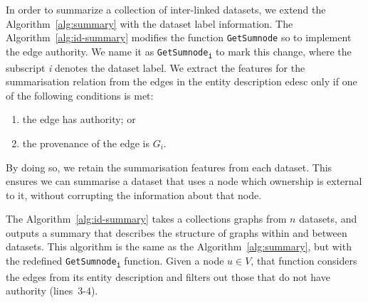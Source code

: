 
In order to summarize a collection of inter-linked datasets, we extend the Algorithm~\ref{alg:summary} with the dataset label information.
The Algorithm~\ref{alg:id-summary} modifies the function \texttt{GetSumnode} so to implement the edge authority.
We name it as \texttt{GetSumnode\textsubscript{i}} to mark this change, where the subscript \emph{i} denotes the dataset label.
We extract the features for the summarisation relation from the edges in the entity description \gls{edesc} only if one of the following conditions is met:
\begin{enumerate}
\item the edge has authority; or
\item the provenance of the edge is $G_i$.
\end{enumerate}
By doing so, we retain the summarisation features from each dataset. This ensures we can summarise a dataset that uses a node which ownership is external to it, without corrupting the information about that node.%

The Algorithm~\ref{alg:id-summary} takes a collections graphs from $n$ datasets, and outputs a summary that describes the structure of graphs within and between datasets. This algorithm is the same as the Algorithm~\ref{alg:summary}, but with the redefined \texttt{GetSumnode\textsubscript{i}} function. Given a node $u \in V$, that function considers the edges from its entity description and filters out those that do not have authority (lines~3-4).

